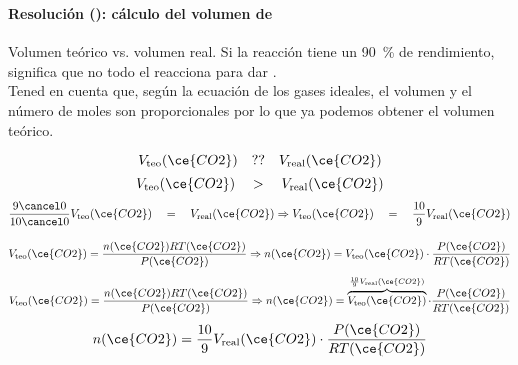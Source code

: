 \begin{frame}
    \frametitle{\ejerciciocmd}
    \framesubtitle{Resolución (): cálculo del volumen de }
     Volumen teórico vs. volumen real. Si la reacción tiene un \SI{90}{\percent} de rendimiento, significa que no todo el  reacciona para dar .\\
    Tened en cuenta que, según la ecuación de los gases ideales, el volumen y el número de moles son proporcionales por lo que ya podemos obtener el volumen teórico.\\
    \begin{overprint}
            $$
                V_{\text{teo}}(\ce{CO2})
                \quad ??\quad 
                V_{\text{real}}(\ce{CO2})
            $$
            $$
                V_{\text{teo}}(\ce{CO2})
                \quad >\quad
                V_{\text{real}}(\ce{CO2})
            $$
            $$
                \frac{9\cancel 0}{10\cancel 0}
                V_{\text{teo}}(\ce{CO2})
                \quad =\quad
                V_{\text{real}}(\ce{CO2})
                \Rightarrow
                V_{\text{teo}}(\ce{CO2})
                \quad =\quad
                \frac{10}{9}
                V_{\text{real}}(\ce{CO2})
            $$
    \end{overprint}
        \begin{overprint}
                $$
                    V_{\text{teo}}(\ce{CO2})=\frac{n(\ce{CO2})RT(\ce{CO2})}{P(\ce{CO2})}
                    \Rightarrow
                    n(\ce{CO2}) = V_{\text{teo}}(\ce{CO2})\cdot\frac{P(\ce{CO2})}{RT(\ce{CO2})}
                $$
                $$
                    V_{\text{teo}}(\ce{CO2})=\frac{n(\ce{CO2})RT(\ce{CO2})}{P(\ce{CO2})}
                    \Rightarrow
                    n(\ce{CO2}) = \overbrace{V_{\text{teo}}(\ce{CO2})}^{\frac{10}{9}V_{\text{real}}(\ce{CO2})}\cdot\frac{P(\ce{CO2})}{RT(\ce{CO2})}
                $$
                $$
                    n(\ce{CO2}) = \frac{10}{9}V_{\text{real}}(\ce{CO2})\cdot\frac{P(\ce{CO2})}{RT(\ce{CO2})}
                $$
        \end{overprint}
\end{frame}


